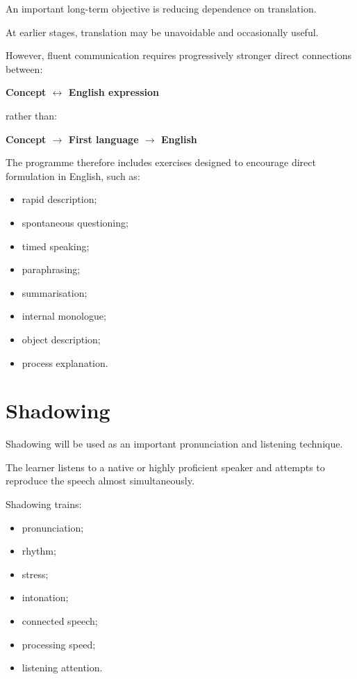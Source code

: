 An important long-term objective is reducing dependence on translation.

At earlier stages, translation may be unavoidable and occasionally useful.

However, fluent communication requires progressively stronger direct connections between:

\begin{center}
\textbf{Concept $\leftrightarrow$ English expression}
\end{center}

rather than:

\begin{center}
\textbf{Concept $\rightarrow$ First language $\rightarrow$ English}
\end{center}

The programme therefore includes exercises designed to encourage direct formulation in English, such as:

\begin{itemize}
    \item rapid description;
    \item spontaneous questioning;
    \item timed speaking;
    \item paraphrasing;
    \item summarisation;
    \item internal monologue;
    \item object description;
    \item process explanation.
\end{itemize}

\section*{Shadowing}

Shadowing will be used as an important pronunciation and listening technique.

The learner listens to a native or highly proficient speaker and attempts to reproduce the speech almost simultaneously.

Shadowing trains:

\begin{itemize}
    \item pronunciation;
    \item rhythm;
    \item stress;
    \item intonation;
    \item connected speech;
    \item processing speed;
    \item listening attention.
\end{itemize}

